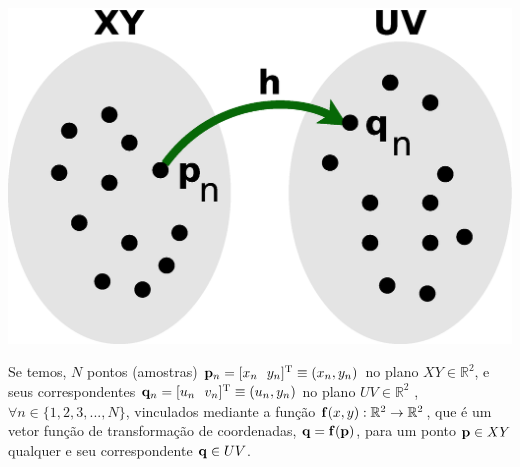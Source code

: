 \begin{theorem}
\label{theo:mapeamento}


~\\
\begin{minipage}{0.4\textwidth}
\centering
\includegraphics[width=0.8\linewidth]{chapters/inverso-mapeamento/mapeamento.eps} 
\end{minipage}
\begin{minipage}{0.6\textwidth}
\quad Se temos, $N$ pontos (amostras) $\VECTOR{p}_n=[x_n~~y_n]^{\transpose}\equiv (x_n,y_n)$ no plano $XY \in \mathbb{R}^2$, e
seus correspondentes $\VECTOR{q}_n=[u_n~~v_n]^{\transpose}\equiv (u_n,y_n)$
no plano $UV \in \mathbb{R}^2$ ,
$\forall n\in \{1, 2, 3, ..., N\}$, 
vinculados mediante a função $\VECTOR{f}(x,y): \mathbb{R}^2 \rightarrow \mathbb{R}^2$, 
que é um vetor função de transformação de coordenadas,
$\VECTOR{q}=\VECTOR{f}(\VECTOR{p})$, 
para um ponto $\VECTOR{p} \in XY$ qualquer e seu correspondente $\VECTOR{q} \in UV$.\\
\end{minipage}


\end{theorem}
